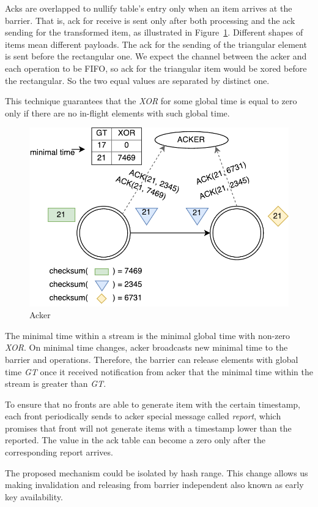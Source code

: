 Acks are overlapped to nullify table's entry only when an item arrives at the barrier. That is, ack for receive is sent only after both processing and the ack sending for the transformed item, as illustrated in Figure~\ref{acker}. Different shapes of items mean different payloads. The ack for the sending of the triangular element is sent before the rectangular one. We expect the channel between the acker and each operation to be FIFO, so ack for the triangular item would be xored before the rectangular. So the two equal values are separated by distinct one. 

This technique guarantees that the {\it XOR} for some global time is equal to zero only if there are no in-flight elements with such global time.

\begin{figure}[htbp]
  \centering
  \includegraphics[scale=0.5]{pics/acker}
  \caption{Acker}
  \label {acker}
\end{figure}

The minimal time within a stream is the minimal global time with non-zero {\it XOR}. On minimal time changes, acker broadcasts new minimal time to the barrier and operations. Therefore, the barrier can release elements with global time {\it GT} once it received notification from acker that the minimal time within the stream is greater than {\it GT}.

To ensure that no fronts are able to generate item with the certain timestamp, each front periodically sends to acker special message called {\it report}, which promises that front will not generate items with a timestamp lower than the reported. The value in the ack table can become a zero only after the corresponding report arrives.

The proposed mechanism could be isolated by hash range. This change allows us making invalidation and releasing from barrier independent also known as early key availability.
